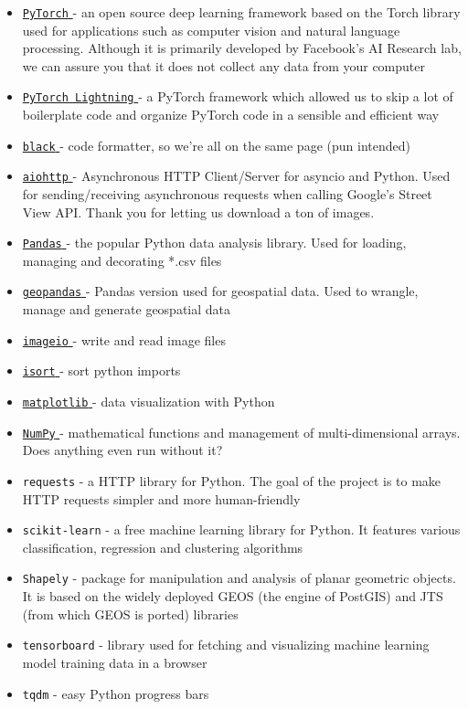 \documentclass[]{article}
\providecommand{\tightlist}{%
  \setlength{\itemsep}{0pt}\setlength{\parskip}{0pt}}
\let\oldtexttt\texttt
\renewcommand{\texttt}[1]{
  \textcolor{tcolor}{\colorbox{bgcolor}{\oldtexttt{#1}}}
}
\begin{document}
\begin{itemize}
\tightlist
\item
  \href{https://pytorch.org/}{\texttt{PyTorch}} - an open source deep
  learning framework based on the Torch library used for applications
  such as computer vision and natural language processing. Although it
  is primarily developed by Facebook's AI Research lab, we can assure
  you that it does not collect any data from your computer
\item
  \href{https://www.pytorchlightning.ai/}{\texttt{PyTorch\ Lightning}} -
  a PyTorch framework which allowed us to skip a lot of boilerplate code
  and organize PyTorch code in a sensible and efficient way
\item
  \href{https://github.com/psf/black}{\texttt{black}} - code formatter,
  so we're all on the same page (pun intended)
\item
  \href{https://docs.aiohttp.org/en/stable/}{\texttt{aiohttp}} -
  Asynchronous HTTP Client/Server for asyncio and Python. Used for
  sending/receiving asynchronous requests when calling Google's Street
  View API. Thank you for letting us download a ton of images.
\item
  \href{https://pandas.pydata.org/}{\texttt{Pandas}} - the popular
  Python data analysis library. Used for loading, managing and
  decorating *.csv files
\item
  \href{https://geopandas.org/en/stable/}{\texttt{geopandas}} - Pandas
  version used for geospatial data. Used to wrangle, manage and generate
  geospatial data
\item
  \href{https://imageio.readthedocs.io/en/stable/}{\texttt{imageio}} -
  write and read image files
\item
  \href{https://github.com/PyCQA/isort}{\texttt{isort}} - sort python
  imports
\item
  \href{https://matplotlib.org/}{\texttt{matplotlib}} - data
  visualization with Python
\item
  \href{https://numpy.org/}{\texttt{NumPy}} - mathematical functions and
  management of multi-dimensional arrays. Does anything even run without
  it?
\item
  \texttt{requests} - a HTTP library for Python. The goal of the project
  is to make HTTP requests simpler and more human-friendly
\item
  \texttt{scikit-learn} - a free machine learning library for Python. It
  features various classification, regression and clustering algorithms
\item
  \texttt{Shapely} - package for manipulation and analysis of planar
  geometric objects. It is based on the widely deployed GEOS (the engine
  of PostGIS) and JTS (from which GEOS is ported) libraries
\item
  \texttt{tensorboard} - library used for fetching and visualizing
  machine learning model training data in a browser
\item
  \texttt{tqdm} - easy Python progress bars
\end{itemize}
\end{document}
